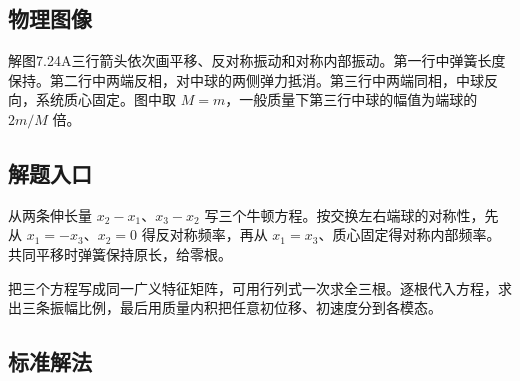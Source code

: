 \documentclass[UTF8,fontset=fandol,a4paper,11pt]{ctexart}
\begin{document}
\subsection*{物理图像}

解图7.24A三行箭头依次画平移、反对称振动和对称内部振动。第一行中弹簧长度保持。第二行中两端反相，对中球的两侧弹力抵消。第三行中两端同相，中球反向，系统质心固定。图中取 $M=m$，一般质量下第三行中球的幅值为端球的 $2m/M$ 倍。




\subsection*{解题入口}

从两条伸长量 $x_2-x_1$、$x_3-x_2$ 写三个牛顿方程。按交换左右端球的对称性，先从 $x_1=-x_3$、$x_2=0$ 得反对称频率，再从 $x_1=x_3$、质心固定得对称内部频率。共同平移时弹簧保持原长，给零根。

把三个方程写成同一广义特征矩阵，可用行列式一次求全三根。逐根代入方程，求出三条振幅比例，最后用质量内积把任意初位移、初速度分到各模态。





\subsection*{标准解法}
\end{document}
